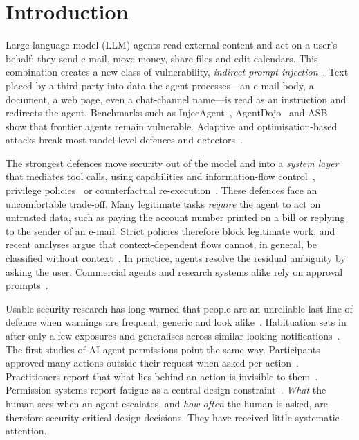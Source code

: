 \documentclass[preprint,12pt,nonatbib]{elsarticle}
\theoremstyle{remark}
\begin{document}
\section{Introduction}
\label{sec:intro}

Large language model (LLM) agents read external content and act on a user's
behalf: they send e-mail, move money, share files and edit calendars. This
combination creates a new class of vulnerability, \emph{indirect prompt
injection}~\citep{greshake2023not,perez2022ignore,liu2024formalizing}. Text
placed by a third party into data the agent processes---an e-mail body, a
document, a web page, even a chat-channel name---is read as an instruction and
redirects the agent. Benchmarks such as InjecAgent~\citep{zhan2024injecagent},
AgentDojo~\citep{debenedetti2024agentdojo} and ASB~\citep{zhang2025asb} show
that frontier agents remain vulnerable. Adaptive and optimisation-based attacks
break most model-level defences and
detectors~\citep{zhan2025adaptive,pandya2025attention,chen2026autoinject,ma2026autodojo}.

The strongest defences move security out of the model and into a
\emph{system layer} that mediates tool calls, using capabilities and
information-flow control~\citep{debenedetti2026camel,costa2025fides,wu2024fsecure},
privilege policies~\citep{shi2025progent,zhao2026clawguard,zhu2025miniscope} or
counterfactual re-execution~\citep{zhu2025melon,he2026attriguard}. These
defences face an uncomfortable trade-off. Many legitimate tasks \emph{require}
the agent to act on untrusted data, such as paying the account number printed
on a bill or replying to the sender of an e-mail. Strict policies therefore
block legitimate work, and recent analyses argue that context-dependent flows
cannot, in general, be classified without
context~\citep{abdelnabi2026always,wang2026landscape}. In practice, agents
resolve the residual ambiguity by asking the user. Commercial agents and
research systems alike rely on approval
prompts~\citep{mozannar2025magentic,michael2026permission,ge2026authorization}.

Usable-security research has long warned that people are an unreliable last
line of defence when warnings are frequent, generic and look
alike~\citep{cranor2008framework,egelman2008warned,sunshine2009crying,felt2012android,akhawe2013alice}.
Habituation sets in after only a few exposures and generalises across
similar-looking notifications~\citep{anderson2015polymorphic,vance2018tuning,vance2025fog}.
The first studies of AI-agent permissions point the same way. Participants
approved many actions outside their request when asked per
action~\citep{yan2026policies}. Practitioners report that what lies behind an
action is invisible to them~\citep{salerno2026agent}. Permission systems report
fatigue as a central design constraint~\citep{brigham2026janus,zhu2025miniscope}.
\emph{What} the human sees when an agent escalates, and \emph{how often} the
human is asked, are therefore security-critical design decisions. They have
received little systematic attention.
\end{document}
